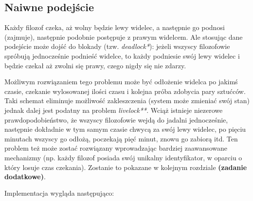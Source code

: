 \documentclass[11pt]{article}
\begin{document}
    \hypertarget{naiwne-podejux15bcie}{%
\subsection{Naiwne podejście}\label{naiwne-podejux15bcie}}

Każdy filozof czeka, aż wolny będzie lewy widelec, a następnie go
podnosi (zajmuje), następnie podobnie postępuje z prawym widelcem. Ale
stosując dane podejście może dojść do blokady (tzw. \emph{deadlock*}):
jeżeli wszyscy filozofowie spróbują jednocześnie podnieść widelce, to
każdy podniesie swój lewy widelec i będzie czekał aż zwolni się prawy,
czego nigdy się nie zdarzy.

Możliwym rozwiązaniem tego problemu może być odłożenie widelca po jakimś
czasie, czekanie wylosowanej ilości czasu i kolejna próba zdobycia pary
sztućców. Taki schemat eliminuje możliwość zakleszczenia (system może
zmieniać swój stan) jednak dalej jest podatny na problem
\emph{livelock**}. Wciąż istnieje niezerowe prawdopodobieństwo, że
wszyscy filozofowie wejdą do jadalni jednocześnie, następnie dokładnie w
tym samym czasie chwycą za swój lewy widelec, po pięciu minutach wszyscy
go odłożą, poczekają pięć minut, znowu go zabiorą itd. Ten problem też
może zostać rozwiązany wprowadzając bardziej zaawansowane mechanizmy
(np. każdy filozof posiada swój unikalny identyfikator, w oparciu o
który losuje czas czekania). Zostanie to pokazane w kolejnym rozdziale
\textbf{(zadanie dodatkowe)}.

Implementacja wygląda następująco:
\end{document}
